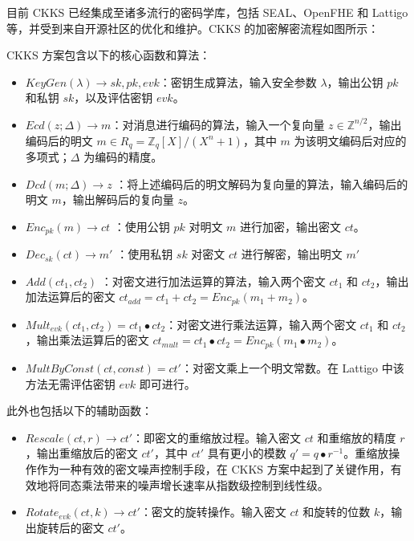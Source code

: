 目前 CKKS 已经集成至诸多流行的密码学库，包括 SEAL、OpenFHE 和 Lattigo 等\cite{sealcrypto,OpenFHE,Mouchet2020LattigoAM}，并受到来自开源社区的优化和维护。CKKS 的加密解密流程如图所示：


CKKS 方案包含以下的核心函数和算法：

\begin{itemize}
    \item $KeyGen(\lambda) \rightarrow sk, pk, evk$：密钥生成算法，输入安全参数 $\lambda$，输出公钥 $pk$ 和私钥 $sk$，以及评估密钥 $evk$。
    \item $Ecd(z; \Delta) \rightarrow m$：对消息进行编码的算法，输入一个复向量 $z \in \mathbb{Z}^{n/2}$，输出编码后的明文 $m \in R_q = \mathbb{Z}_q[X]/(X^n+1)$，其中 $m$ 为该明文编码后对应的多项式；$\Delta$ 为编码的精度。
    \item $Dcd(m; \Delta) \rightarrow z$ ：将上述编码后的明文解码为复向量的算法，输入编码后的明文 $m$，输出解码后的复向量 $z$。
    \item $Enc_{pk}(m) \rightarrow ct$ ：使用公钥 $pk$ 对明文 $m$ 进行加密，输出密文 $ct$。
    \item $Dec_{sk}(ct) \rightarrow m'$ ：使用私钥 $sk$ 对密文 $ct$ 进行解密，输出明文 $m'$
    \item $Add(ct_1, ct_2)$ ：对密文进行加法运算的算法，输入两个密文 $ct_1$ 和 $ct_2$，输出加法运算后的密文 $ct_{add} = ct_1 + ct_2 = Enc_{pk}(m_1 + m_2)$。
    \item $Mult_{evk}(ct_1, ct_2) = ct_1 \bullet ct_2$：对密文进行乘法运算，输入两个密文 $ct_1$ 和 $ct_2$，输出乘法运算后的密文 $ct_{mult} = ct_1 \bullet ct_2 = Enc_{pk}(m_1 \bullet m_2)$。
    \item $MultByConst(ct, const) = ct'$：对密文乘上一个明文常数。在 Lattigo 中该方法无需评估密钥 $evk$ 即可进行。\cite{lattigoRepo}
\end{itemize}

此外也包括以下的辅助函数：

\begin{itemize}
    \item $Rescale(ct, r) \rightarrow ct'$：即密文的重缩放过程。输入密文 $ct$ 和重缩放的精度 $r$，输出重缩放后的密文 $ct'$，其中 $ct'$ 具有更小的模数 $q' = q \bullet r^{-1}$。重缩放操作作为一种有效的密文噪声控制手段，在 CKKS 方案中起到了关键作用，有效地将同态乘法带来的噪声增长速率从指数级控制到线性级。
    \item $Rotate_{evk}(ct, k) \rightarrow ct'$：密文的旋转操作。输入密文 $ct$ 和旋转的位数 $k$，输出旋转后的密文 $ct'$。
\end{itemize}

